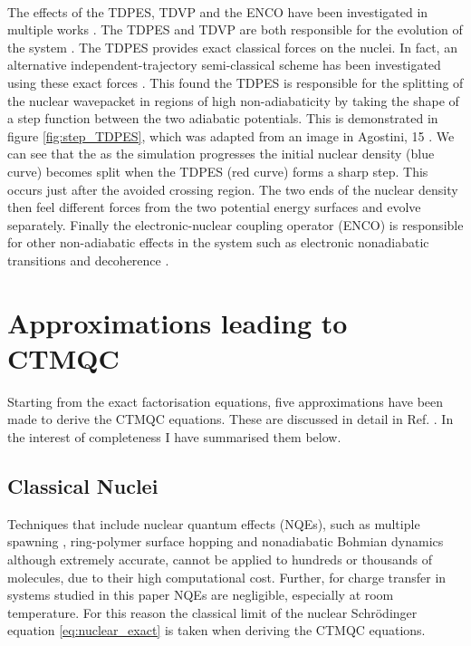\\
The effects of the TDPES, TDVP and the ENCO have been investigated in multiple works \cite{agostini_semiclassical_2015, agostini_exact_2015, agostini_mixed_2013, abedi_dynamical_2013, Min2014Dec}. The TDPES and TDVP are both responsible for the evolution of the system
\cite{agostini_semiclassical_2015}. The TDPES provides exact classical forces on the nuclei. In fact, an alternative independent-trajectory semi-classical scheme has been investigated using these exact forces \cite{agostini_exact_2015}. This found the TDPES is responsible for the splitting of the nuclear wavepacket in regions of high non-adiabaticity by taking the shape of a step function between the two adiabatic potentials. This is demonstrated in figure \ref{fig:step_TDPES}, which was adapted from an image in Agostini, 15 \cite{agostini_semiclassical_2015}. We can see that the as the simulation progresses the initial nuclear density (blue curve) becomes split when the TDPES (red curve) forms a sharp step. This occurs just after the avoided crossing region. The two ends of the nuclear density then feel different forces from the two potential energy surfaces and evolve separately. Finally the electronic-nuclear coupling operator (ENCO) is responsible for other non-adiabatic effects in the system such as electronic nonadiabatic transitions and decoherence \cite{agostini_semiclassical_2015}.
\section{Approximations leading to CTMQC}
\label{sect:CTMQC_Approx}
Starting from the exact factorisation equations, five approximations have been made to derive the CTMQC equations. These are discussed in detail in Ref. \cite{agostini_quantum-classical_2016}. In the interest of completeness I have summarised them below.
\subsection{Classical Nuclei}
Techniques that include nuclear quantum effects (NQEs), such as multiple spawning \cite{Martnnez*2005Oct}, ring-polymer surface hopping \cite{Shakib2017Jul} and nonadiabatic Bohmian dynamics \cite{Curchod2011Feb, Tavernelli2013Apr} although extremely accurate, cannot be applied to hundreds or thousands of molecules, due to their high computational cost. Further, for charge transfer in systems studied in this paper NQEs are negligible, especially at room temperature. For this reason the classical limit of the nuclear Schr\"odinger equation \eqref{eq:nuclear_exact} is taken when deriving the CTMQC equations.
